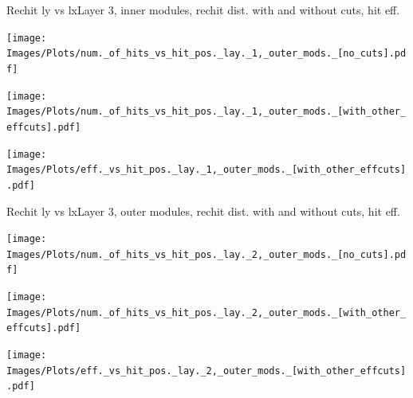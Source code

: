 \documentclass{beamer}
\begin{document}
\begin{frame}{Rechit ly vs lx}{Layer 3, inner modules, rechit dist. with and without cuts, hit eff.}
  \begin{minipage}{0.32\textwidth}
    \centering
    \texttt{[image: Images/Plots/num.\_of\_hits\_vs\_hit\_pos.\_lay.\_1,\_outer\_mods.\_[no\_cuts].pdf]}
  \end{minipage}%
  \begin{minipage}{0.32\textwidth}
    \centering
    \texttt{[image: Images/Plots/num.\_of\_hits\_vs\_hit\_pos.\_lay.\_1,\_outer\_mods.\_[with\_other\_effcuts].pdf]}
  \end{minipage}%
  \begin{minipage}{0.32\textwidth}
    \centering
    \texttt{[image: Images/Plots/eff.\_vs\_hit\_pos.\_lay.\_1,\_outer\_mods.\_[with\_other\_effcuts].pdf]}
  \end{minipage}
\end{frame}

\begin{frame}{Rechit ly vs lx}{Layer 3, outer modules, rechit dist. with and without cuts, hit eff.}
  \begin{minipage}{0.32\textwidth}
    \centering
    \texttt{[image: Images/Plots/num.\_of\_hits\_vs\_hit\_pos.\_lay.\_2,\_outer\_mods.\_[no\_cuts].pdf]}
  \end{minipage}%
  \begin{minipage}{0.32\textwidth}
    \centering
    \texttt{[image: Images/Plots/num.\_of\_hits\_vs\_hit\_pos.\_lay.\_2,\_outer\_mods.\_[with\_other\_effcuts].pdf]}
  \end{minipage}%
  \begin{minipage}{0.32\textwidth}
    \centering
    \texttt{[image: Images/Plots/eff.\_vs\_hit\_pos.\_lay.\_2,\_outer\_mods.\_[with\_other\_effcuts].pdf]}
  \end{minipage}
\end{frame}
\end{document}
